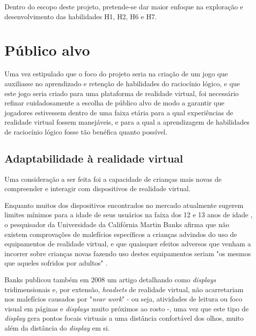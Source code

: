 Dentro do escopo deste projeto, pretende-se dar maior enfoque na exploração e
desenvolvimento das habilidades H1, H2, H6 e H7.


\section{Público alvo}\label{sec-publico-alvo}

Uma vez estipulado que o foco do projeto seria na criação de um jogo que
auxiliasse no aprendizado e retenção de habilidades do raciocínio lógico,
e que este jogo seria criado para uma plataforma de realidade virtual,
foi necessário refinar cuidadosamente a escolha de público alvo de modo a
garantir que jogadores estivessem dentro de uma faixa etária para a qual 
experiências de realidade virtual fossem manejáveis, e para a qual a
aprendizagem de habilidades de raciocínio lógico fosse tão benéfica quanto
possível.

\subsection{Adaptabilidade à realidade virtual}

Uma consideração a ser feita foi a capacidade de crianças mais novas de
compreender e interagir com dispositivos de realidade virtual.

Enquanto muitos dos dispositivos encontrados no mercado atualmente sugerem
limites mínimos para a idade de seus usuários na faixa dos 12 e 13 anos de
idade \cite{seeto:2016:playstation-vr}, o pesquisador da Universidade da Califórnia Martin Banks afirma que
não existem comprovações de malefícios específicos a crianças advindos do
uso de equipamentos de realidade virtual, e que quaisquer efeitos adversos
que venham a incorrer sobre crianças novas fazendo uso destes equipamentos
seriam "os mesmos que aqueles sofridos por adultos" \cite{hill:2016:vr-safe}.

Banks publicou também em 2008 um artigo \cite{hoffman2008vergence} detalhando como \textit{displays}
tridimensionais e, por extensão, \textit{headsets} de realidade virtual,
não acarretariam nos malefícios causados por "\textit{near work}" - ou
seja, atividades de leitura ou foco visual em páginas e \textit{displays}
muito próximos ao rosto -, uma vez que este tipo de \textit{display} gera
pontos focais virtuais a uma distância confortável dos olhos, muito além
da distância do \textit{display} em si.

